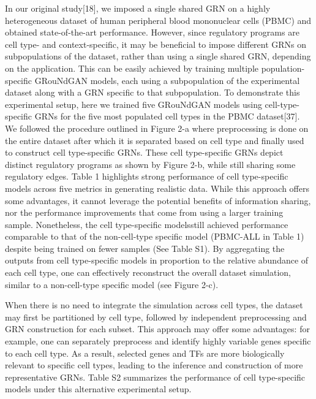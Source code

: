 In our original study[18], we imposed a single shared GRN on a highly heterogeneous dataset of
human peripheral blood mononuclear cells (PBMC) and obtained state-of-the-art performance.
However, since regulatory programs are cell type- and context-specific, it may be beneficial to
impose different GRNs on subpopulations of the dataset, rather than using a single shared GRN,
depending on the application. This can be easily achieved by training multiple population-specific
GRouNdGAN models, each using a subpopulation of the experimental dataset along with a GRN
specific to that subpopulation. To demonstrate this experimental setup, here we trained five
GRouNdGAN models using cell-type-specific GRNs for the five most populated cell types in the
PBMC dataset[37]. We followed the procedure outlined in Figure 2-a where preprocessing is
done on the entire dataset after which it is separated based on cell type and finally used to
construct cell type-specific GRNs. These cell type-specific GRNs depict distinct regulatory
programs as shown by Figure 2-b, while still sharing some regulatory edges. Table 1 highlights
strong performance of cell type-specific models across five metrics in generating realistic data.
While this approach offers some advantages, it cannot leverage the potential benefits of
information sharing, nor the performance improvements that come from using a larger training
sample. Nonetheless, the cell type-specific modelsstill achieved performance comparable to that
of the non-cell-type specific model (PBMC-ALL in Table 1) despite being trained on fewer samples (See Table S1). By aggregating the outputs from cell type-specific models in proportion to the
relative abundance of each cell type, one can effectively reconstruct the overall dataset
simulation, similar to a non-cell-type specific model (see Figure 2-c).

When there is no need to integrate the simulation across cell types, the dataset may first be
partitioned by cell type, followed by independent preprocessing and GRN construction for each
subset. This approach may offer some advantages: for example, one can separately preprocess
and identify highly variable genes specific to each cell type. As a result, selected genes and TFs
are more biologically relevant to specific cell types, leading to the inference and construction of
more representative GRNs. Table S2 summarizes the performance of cell type-specific models
under this alternative experimental setup. 

